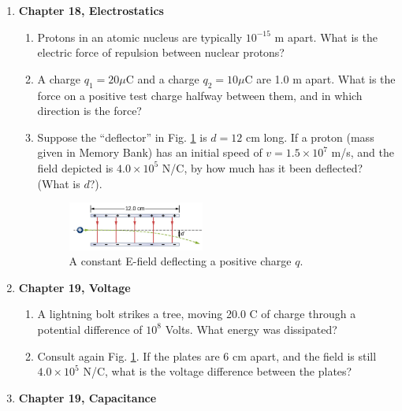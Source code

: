 \documentclass[10pt]{article}
\begin{document}
\clearpage

\begin{enumerate}
\item \textbf{Chapter 18, Electrostatics}
\begin{enumerate}
\item Protons in an atomic nucleus are typically $10^{-15}$ m apart. What is the electric force of repulsion between nuclear protons? \\ \vspace{2cm}
\item A charge $q_1 = 20 \mu$C and a charge $q_2 = 10 \mu$C are 1.0 m apart.  What is the force on a positive test charge halfway between them, and in which direction is the force? \\ \vspace{2cm}
\item Suppose the ``deflector'' in Fig. \ref{fig:e1} is $d=12$ cm long.  If a proton (mass given in Memory Bank) has an initial speed of $v=1.5 \times 10^{7}$ m/s, and the field depicted is $4.0 \times 10^5$ N/C, by how much has it been deflected?  (What is $d$?). \\ \vspace{2cm}
\begin{figure}
\centering
\includegraphics[width=0.45\textwidth]{figures/e1.png}
\caption{\label{fig:e1} A constant E-field deflecting a positive charge $q$.}
\end{figure}
\end{enumerate}
\item \textbf{Chapter 19, Voltage}
\begin{enumerate}
\item A lightning bolt strikes a tree, moving 20.0 C of charge through a potential difference of $10^8$ Volts. What energy was dissipated? \\ \vspace{2cm}
\item Consult again Fig. \ref{fig:e1}.  If the plates are 6 cm apart, and the field is still $4.0 \times 10^5$ N/C, what is the voltage difference between the plates? \\ \vspace{2cm}
\end{enumerate}
\item \textbf{Chapter 19, Capacitance}

\end{enumerate}
\end{document}
